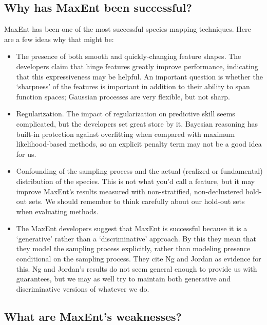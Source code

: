 \subsection{Why has MaxEnt been successful?}
MaxEnt has been one of the most successful species-mapping techniques. Here are a few ideas why that might be:
\begin{itemize}
    \item The presence of both smooth and quickly-changing feature shapes. The developers claim that hinge features greatly improve performance, indicating that this expressiveness may be helpful. An important question is whether the `sharpness' of the features is important in addition to their ability to span function spaces; Gaussian processes are very flexible, but not sharp.
    \item Regularization. The impact of regularization on predictive skill seems complicated, but the developers set great store by it. Bayesian reasoning has built-in protection against overfitting when compared with maximum likelihood-based methods, so an explicit penalty term may not be a good idea for us.
    \item Confounding of the sampling process and the actual (realized or fundamental) distribution of the species. This is not what you'd call a feature, but it may improve MaxEnt's results measured with non-stratified, non-declustered hold-out sets. We should remember to think carefully about our hold-out sets when evaluating methods.
    \item The MaxEnt developers suggest that MaxEnt is successful because it is a `generative' rather than a `discriminative' approach. By this they mean that they model the sampling process explicitly, rather than modeling presence conditional on the sampling process. They cite Ng and Jordan \cite{Ng:2009p12220} as evidence for this. Ng and Jordan's results do not seem general enough to provide us with guarantees, but we may as well try to maintain both generative and discriminative versions of whatever we do.
\end{itemize}


\subsection{What are MaxEnt's weaknesses?}

\label{sec:weaknesses}

